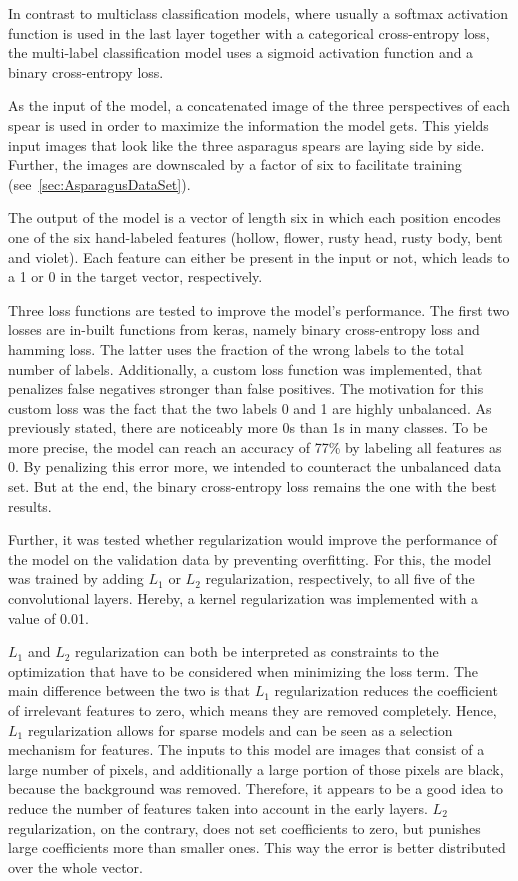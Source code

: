In contrast to multiclass classification models, where usually a softmax activation function is used in the last layer together with a categorical cross-entropy loss, the multi-label classification model uses a sigmoid activation function and a binary cross-entropy loss.

As the input of the model, a concatenated image of the three perspectives of each spear is used in order to maximize the information the model gets. This yields input images that look like the three asparagus spears are laying side by side. Further, the images are downscaled by a factor of six to facilitate training (see~\autoref{sec:AsparagusDataSet}).

The output of the model is a vector of length six in which each position encodes one of the six hand-labeled features (hollow, flower, rusty head, rusty body, bent and violet). Each feature can either be present in the input or not, which leads to a 1 or 0 in the target vector, respectively.

Three loss functions are tested to improve the model's performance. The first two losses are in-built functions from keras, namely binary cross-entropy loss and hamming loss. The latter uses the fraction of the wrong labels to the total number of labels. Additionally, a custom loss function was implemented, that penalizes false negatives stronger than false positives. The motivation for this custom loss was the fact that the two labels 0 and 1 are highly unbalanced. As previously stated, there are noticeably more 0s than 1s in many classes. To be more precise, the model can reach an accuracy of 77\% by labeling all features as 0. By penalizing this error more, we intended to counteract the unbalanced data set. But at the end, the binary cross-entropy loss remains the one with the best results.

Further, it was tested whether regularization would improve the performance of the model on the validation data by preventing overfitting. For this, the model was trained by adding \(L_1\) or \(L_2\) regularization, respectively, to all five of the convolutional layers.  Hereby, a kernel regularization was implemented with a value of 0.01.

\(L_1\) and \(L_2\) regularization can both be interpreted as constraints to the optimization that have to be considered when minimizing the loss term. The main difference between the two is that \(L_1\) regularization reduces the coefficient of irrelevant features to zero, which means they are removed completely. Hence, \(L_1\) regularization allows for sparse models and can be seen as a selection mechanism for features. The inputs to this model are images that consist of a large number of pixels, and additionally a large portion of those pixels are black, because the background was removed. Therefore, it appears to be a good idea to reduce the number of features taken into account in the early layers. \(L_2\) regularization, on the contrary, does not set coefficients to zero, but punishes large coefficients more than smaller ones. This way the error is better distributed over the whole vector.


